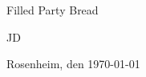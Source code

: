 \begin{titlepage}

\sffamily

\raggedleft

\vspace*{-2cm}


\vfill

\centering
\LARGE

\Large


\vspace{2cm}

\LARGE

Filled Party Bread 

\vspace{2cm}

\Large

\vspace{1.5cm}


\Large


\vspace{0.5cm}


\LARGE
JD \vspace{1cm}

\vspace{1cm}

\flushleft
 \Large
\vspace*{\fill}

\begin{tabbing}
\end{tabbing}
Rosenheim, den \today
\end{titlepage}

\cleardoubleemptypage


